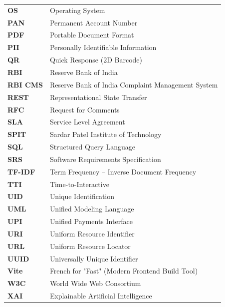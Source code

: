 \begin{longtable}{p{3.5cm}p{11.5cm}}
\textbf{OS} & Operating System \\
\textbf{PAN} & Permanent Account Number \\
\textbf{PDF} & Portable Document Format \\
\textbf{PII} & Personally Identifiable Information \\
\textbf{QR} & Quick Response (2D Barcode) \\
\textbf{RBI} & Reserve Bank of India \\
\textbf{RBI CMS} & Reserve Bank of India Complaint Management System \\
\textbf{REST} & Representational State Transfer \\
\textbf{RFC} & Request for Comments \\
\textbf{SLA} & Service Level Agreement \\
\textbf{SPIT} & Sardar Patel Institute of Technology \\
\textbf{SQL} & Structured Query Language \\
\textbf{SRS} & Software Requirements Specification \\
\textbf{TF-IDF} & Term Frequency -- Inverse Document Frequency \\
\textbf{TTI} & Time-to-Interactive \\
\textbf{UID} & Unique Identification \\
\textbf{UML} & Unified Modeling Language \\
\textbf{UPI} & Unified Payments Interface \\
\textbf{URI} & Uniform Resource Identifier \\
\textbf{URL} & Uniform Resource Locator \\
\textbf{UUID} & Universally Unique Identifier \\
\textbf{Vite} & French for "Fast" (Modern Frontend Build Tool) \\
\textbf{W3C} & World Wide Web Consortium \\
\textbf{XAI} & Explainable Artificial Intelligence \\
\end{longtable}
